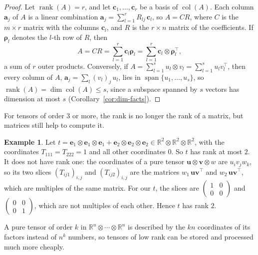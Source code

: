 \documentclass[11pt]{article}
\theoremstyle{definition}
\newtheorem{example}[definition]{Example}
\theoremstyle{plain}
\theoremstyle{remark}
\DeclareMathOperator{\rank}{rank}
\DeclareMathOperator{\col}{col}
\DeclareMathOperator{\Span}{span}
\begin{document}
\begin{proof}
    Let $\rank(A) = r$, and let $\mathbf{c}_1, \ldots, \mathbf{c}_r$ be a basis of $\col(A)$. Each column $\mathbf{a}_j$ of $A$ is a linear combination $\mathbf{a}_j = \sum_{l=1}^r R_{lj}\, \mathbf{c}_l$, so $A = CR$, where $C$ is the $m \times r$ matrix with the columns $\mathbf{c}_l$, and $R$ is the $r \times n$ matrix of the coefficients. If $\boldsymbol{\rho}_l$ denotes the $l$-th row of $R$, then
    \[A = CR = \sum_{l=1}^r \mathbf{c}_l \boldsymbol{\rho}_l = \sum_{l=1}^r \mathbf{c}_l \otimes \boldsymbol{\rho}_l^\top,\]
    a sum of $r$ outer products. Conversely, if $A = \sum_{l=1}^s u_l \otimes v_l = \sum_{l=1}^s u_l v_l^\top$, then every column of $A$, $\mathbf{a}_j = \sum_l (v_l)_j\, u_l$, lies in $\Span\{u_1, \ldots, u_s\}$, so $\rank(A) = \dim \col(A) \leq s$, since a subspace spanned by $s$ vectors has dimension at most $s$ (Corollary~\ref{cor:dim-facts}).
\end{proof}

For tensors of order $3$ or more, the rank is no longer the rank of a matrix, but matrices still help to compute it.

\begin{example}\label{ex:tensor-rank-2}
    Let $t = \mathbf{e}_1 \otimes \mathbf{e}_1 \otimes \mathbf{e}_1 + \mathbf{e}_2 \otimes \mathbf{e}_2 \otimes \mathbf{e}_2 \in \mathbb{R}^2 \otimes \mathbb{R}^2 \otimes \mathbb{R}^2$, with the coordinates $T_{111} = T_{222} = 1$ and all other coordinates $0$. So $t$ has rank at most $2$. It does not have rank one: the coordinates of a pure tensor $\mathbf{u} \otimes \mathbf{v} \otimes w$ are $u_iv_jw_k$, so its two slices $(T_{ij1})_{i,j}$ and $(T_{ij2})_{i,j}$ are the matrices $w_1\, \mathbf{u}\mathbf{v}^\top$ and $w_2\, \mathbf{u}\mathbf{v}^\top$, which are multiples of the same matrix. For our $t$, the slices are $\left(\begin{smallmatrix} 1 & 0 \\ 0 & 0 \end{smallmatrix}\right)$ and $\left(\begin{smallmatrix} 0 & 0 \\ 0 & 1 \end{smallmatrix}\right)$, which are not multiples of each other. Hence $t$ has rank $2$.
\end{example}

A pure tensor of order $k$ in $\mathbb{R}^n \otimes \cdots \otimes \mathbb{R}^n$ is described by the $kn$ coordinates of its factors instead of $n^k$ numbers, so tensors of low rank can be stored and processed much more cheaply.
\end{document}
